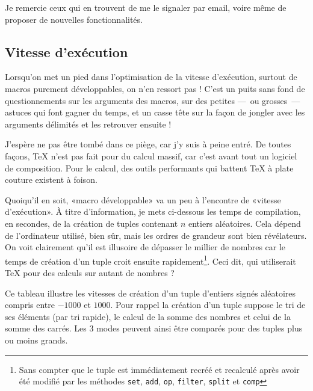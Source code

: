\documentclass[french,a4paper]{article}
\begin{document}
Je remercie ceux qui en trouvent de me le signaler par email, voire même de proposer de nouvelles fonctionnalités.

\subsection{Vitesse d'exécution}
Lorsqu'on met un pied dans l'optimisation de la vitesse d'exécution, surtout de macros purement développables, on n'en ressort pas ! C'est un puits sans fond de questionnements sur les arguments des macros, sur des petites ---~ou grosses~--- astuces qui font gagner du temps, et un casse tête sur la façon de jongler avec les arguments délimités et les retrouver ensuite !

J'espère ne pas être tombé dans ce piège, car j'y suis à peine entré. De toutes façons, \TeX{} n'est pas fait pour du calcul massif, car c'est avant tout un logiciel de composition. Pour le calcul, des outils performants qui battent \TeX{} à plate couture existent à foison.

Quoiqu'il en soit, «macro développable» va un peu à l'encontre de «vitesse d'exécution». À titre d'information, je mets ci-dessous les temps de compilation, en secondes, de la création de tuples contenant $n$ entiers aléatoires. Cela dépend de l'ordinateur utilisé, bien sûr, mais les ordres de grandeur sont bien révélateurs. On voit clairement qu'il est illusoire de dépasser le millier de nombres car le temps de création d'un tuple croit ensuite rapidement\footnote{Sans compter que le tuple est immédiatement recréé et recalculé après avoir été modifié par les méthodes \texttt{set}, \texttt{add}, \texttt{op}, \texttt{filter}, \texttt{split} et \texttt{comp}}. Ceci dit, qui utiliserait \TeX{} pour des calculs sur autant de nombres ?

Ce tableau illustre les vitesses de création d'un tuple d'entiers signés aléatoires compris entre $-1000$ et $1000$. Pour rappel la création d'un tuple suppose le tri de ses éléments (par tri rapide), le calcul de la somme des nombres et celui de la somme des carrés. Les 3 modes peuvent ainsi être comparés pour des tuples plus ou moins grands.\label{benchmark}
\end{document}
